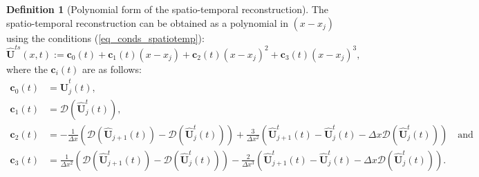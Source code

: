 \documentclass[12pt,a4paper]{article}
\numberwithin{equation}{section}
\theoremstyle{definition}
\newcommand{\FD}{\mathcal{D}}
\newcommand{\vect}[1]{\textbf{#1}}
\newcommand{\qp}[1]{\left(#1\right)}
\newcommand{\rec}[1]{\widehat{{#1}}}
\newcommand{\rects}[1]{\widehat{{\vect{#1}}}^{ts}}
\newtheorem{Defn}[subsection]{Definition}
\begin{document}
\begin{Defn}[Polynomial form of the spatio-temporal reconstruction]\label{defn_spatio_temp_rec_shw}
	The spatio-temporal reconstruction can be obtained as a polynomial in $\qp{x-x_j}$  using the conditions (\ref{eq_conds_spatiotemp}):
	\begin{equation}
\rects{U}\qp{x,t}:=\vect{c}_0\qp{t} +\vect{c}_1\qp{t}\qp{x-x_j} +\vect{c}_2\qp{t}\qp{x-x_j}^2+\vect{c}_3\qp{t}\qp{x-x_j}^3,
	\end{equation}
where the $\vect{c}_i\qp{t}$ are as follows:
	\begin{equation}
	\begin{aligned}
	\vect{c}_{0}\qp{t} &= \rec{\vect{U}}^t_j\qp{t},\\
	\vect{c}_{1}\qp{t}&=\FD\qp{\rec{\vect{U}}^t_j\qp{t}},\\
	\vect{c}_{2}\qp{t}&=-\frac{1}{\Delta x}\qp{\FD\qp{\rec{\vect{U}}_{j+1}\qp{t}}-\FD\qp{\rec{\vect{U}}^t_j\qp{t}}}+
	\frac{3}{\Delta x^2}\qp{ \rec{\vect{U}}^t_{j+1}\qp{t}- \rec{\vect{U}}^t_j\qp{t}-\Delta x\FD\qp{\rec{\vect{U}}^t_{j}\qp{t}}}\quad \text{and}\\
	\vect{c}_{3}\qp{t}&=\frac{1}{\Delta x^2}\qp{\FD\qp{\rec{\vect{U}}^t_{j+1}\qp{t}}-\FD\qp{\rec{\vect{U}}^t_{j}\qp{t}}}
	-\frac{2}{\Delta x^3}\qp{\rec{\vect{U}}^t_{j+1}\qp{t}-\rec{\vect{U}}^t_j\qp{t}-\Delta x \FD\qp{\rec{\vect{U}}^t_j\qp{t}}}.\\
	\end{aligned}
	\end{equation}
\end{Defn}
\end{document}
